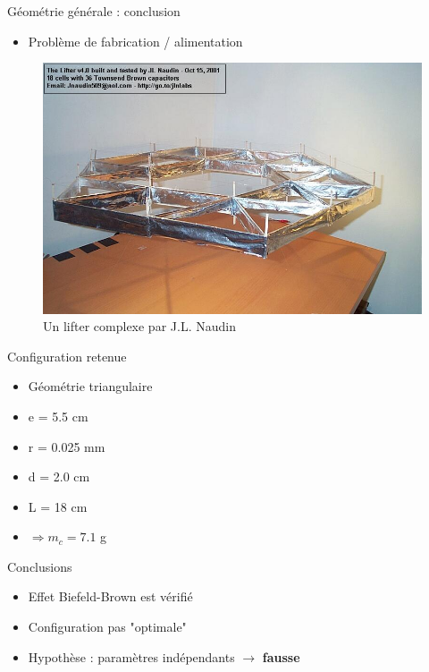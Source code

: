 \documentclass{beamer}
\begin{document}
	\begin{frame}{Géométrie générale : conclusion}
		\begin{itemize}
			\item Problème de fabrication / alimentation
		\end{itemize}
	
		\begin{figure}
			\center
			\includegraphics[scale=0.3]{img/lifter_naudin.jpg}
			\caption{Un lifter complexe par J.L. Naudin}
		\end{figure}
	\end{frame}

	\begin{frame}{Configuration retenue}
		\begin{itemize}
			\item Géométrie triangulaire
			\item e = 5.5 cm
			\item r = 0.025 mm
			\item d = 2.0 cm
			\item L = 18 cm
			\item $\Rightarrow m_c = 7.1$ g
		\end{itemize}
	\end{frame}

	\begin{frame}{Conclusions}
		\begin{itemize}
			\item Effet Biefeld-Brown est vérifié
			\item Configuration pas "optimale"
			\item Hypothèse : paramètres indépendants $\longrightarrow$ \textbf{fausse}
		\end{itemize}
	\end{frame}
\end{document}

